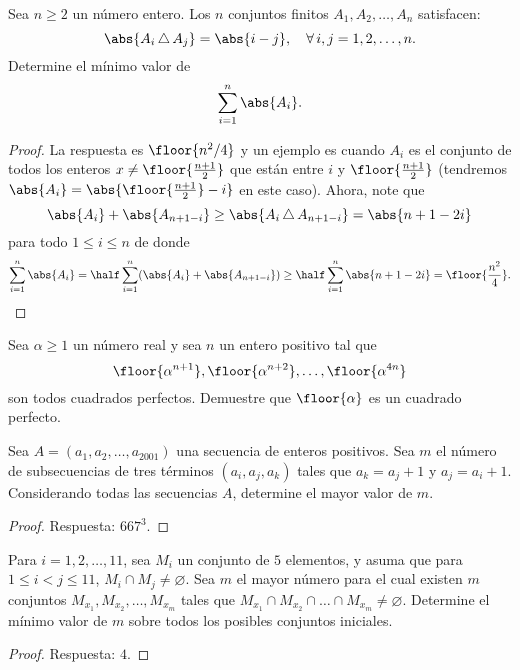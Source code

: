 \begin{probMG}
	Sea $n\ge 2$ un número entero. Los $n$ conjuntos finitos $A_1,A_2,\dots,A_n$ satisfacen:
	\[\abs{A_i\,\triangle\,A_j}=\abs{i-j},\quad\forall\,i,j=1,2,\dots,n.\]
	Determine el mínimo valor de
	\[\sum_{i=1}^n\abs{A_i}.\]
\end{probMG}

\begin{proof}
	La respuesta es $\floor{n^2/4}$ y un ejemplo es cuando $A_i$ es el conjunto de todos los enteros $x\ne\floor{\frac{n+1}{2}}$ que están entre $i$ y $\floor{\frac{n+1}{2}}$ (tendremos $\abs{A_i}=\abs{\floor{\frac{n+1}{2}}-i}$ en este caso). Ahora, note que
	\[\abs{A_i}+\abs{A_{n+1-i}}\ge\abs{A_i\,\triangle\,A_{n+1-i}}=\abs{n+1-2i}\]
	para todo $1\le i\le n$ de donde
	\[\sum_{i=1}^n\abs{A_i}=\half\sum_{i=1}^n(\abs{A_i}+\abs{A_{n+1-i}})\ge\half\sum_{i=1}^n\abs{n+1-2i}=\floor{\frac{n^2}{4}}.\]
\end{proof}

\begin{problem}
	Sea $\alpha\ge 1$ un número real y sea $n$ un entero positivo tal que
	\[\floor{\alpha^{n+1}},\floor{\alpha^{n+2}},\dots,\floor{\alpha^{4n}}\]
	son todos cuadrados perfectos. Demuestre que $\floor{\alpha}$ es un cuadrado perfecto.
\end{problem}


\begin{probEG}
	Sea $A=(a_1,a_2,\dots,a_{2001})$ una secuencia de enteros positivos. Sea $m$ el número de subsecuencias de tres términos $(a_i,a_j,a_k)$ tales que $a_k=a_j+1$ y $a_j=a_i+1$. Considerando todas las secuencias $A$, determine el mayor valor de $m$.
\end{probEG}

\begin{proof}
	Respuesta: $667^3$.
\end{proof}

\begin{probEG}
	Para $i=1,2,\dots,11$, sea $M_i$ un conjunto de $5$ elementos, y asuma que para $1\le i<j\le 11$, $M_i\cap M_j\ne\varnothing$. Sea $m$ el mayor número para el cual existen $m$ conjuntos $M_{x_1},M_{x_2},\dots,M_{x_m}$ tales que $M_{x_1}\cap M_{x_2}\cap\dots\cap M_{x_m}\ne\varnothing$. Determine el mínimo valor de $m$ sobre todos los posibles conjuntos iniciales.
\end{probEG}

\begin{proof}
	Respuesta: $4$.
\end{proof}

